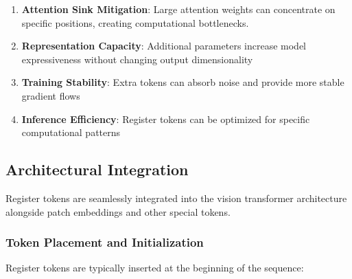 \begin{enumerate}
\item \textbf{Attention Sink Mitigation}: Large attention weights can concentrate on specific positions, creating computational bottlenecks.
\item \textbf{Representation Capacity}: Additional parameters increase model expressiveness without changing output dimensionality
\item \textbf{Training Stability}: Extra tokens can absorb noise and provide more stable gradient flows
\item \textbf{Inference Efficiency}: Register tokens can be optimized for specific computational patterns
\end{enumerate}
\begin{comment}
It's worth explaining the first point a bit more. "Some studies found that in the absence of dedicated 'scratch space,' some patch tokens would spontaneously become 'attention sinks,' attracting a large amount of attention from other tokens. Register tokens provide a dedicated, non-content-based place for this global information to be stored, freeing up the patch tokens to focus on representing their local features."
\end{comment}

\subsection{Architectural Integration}

Register tokens are seamlessly integrated into the vision transformer architecture alongside patch embeddings and other special tokens.

\subsubsection{Token Placement and Initialization}

Register tokens are typically inserted at the beginning of the sequence:

